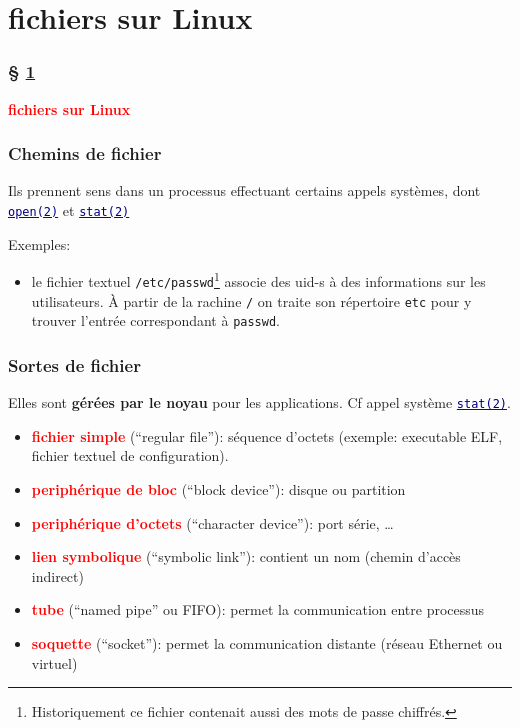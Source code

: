 \documentclass[lualatex,11pt,a4paper,svgnames,french]{beamer}
\newcommand{\clbman}[2]{{\href{https://man7.org/linux/man-pages/#1.html}{{\textcolor{Navy}{\texttt{#2}}}}}}
\newcommand{\clbrougras}[1]{{\textcolor{Red}{\textbf{#1}}}}
\begin{document}
\section{fichiers sur Linux}
\label{sec:file}
\begin{frame}\frametitle{§ \ref{sec:file}}
{\Large \clbrougras{fichiers sur Linux}}
\end{frame}
\begin{frame}\frametitle{Chemins de fichier}
  Ils prennent sens dans un processus effectuant certains appels systèmes, dont 
  {\href{https://man7.org/linux/man-pages/man2/open.2.html}{\texttt{\textcolor{Navy}{open(2)}}}} et 
  {\href{https://man7.org/linux/man-pages/man2/stat.2.html}{\texttt{\textcolor{Navy}{stat(2)}}}}

  \medskip

  Exemples:
  \begin{itemize}
  \item le fichier textuel
    \texttt{/etc/passwd}\footnote{Historiquement ce fichier contenait
    aussi des mots de passe chiffrés.} associe des uid-s à des
    informations sur les utilisateurs. À partir de la rachine
    \texttt{/} on traite son répertoire \texttt{etc} pour y trouver
    l'entrée correspondant à \texttt{passwd}.
  \end{itemize}
\end{frame}
\begin{frame}\frametitle{Sortes de fichier}
  Elles sont \textbf{gérées par le noyau} pour les applications.
  Cf appel système \clbman{man2/stat.2}{stat(2)}.
  \begin{itemize}
  \item \clbrougras{fichier simple} (``regular file''): séquence d'octets (exemple: executable ELF, fichier textuel de configuration).
  \item \clbrougras{periphérique de bloc} (``block device''): disque ou partition
  \item \clbrougras{periphérique d'octets} (``character device''): port série, \ldots
    \item \clbrougras{lien symbolique} (``symbolic link''): contient un nom (chemin d'accès indirect)
  \item \clbrougras{tube} (``named pipe'' ou FIFO): permet la communication entre processus
    \item \clbrougras{soquette} (``socket''): permet la communication distante
      (réseau Ethernet ou virtuel)
  \end{itemize}
\end{frame}
\end{document}
